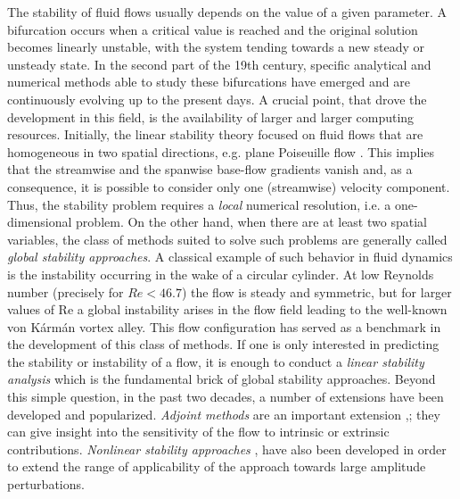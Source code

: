 \documentclass[twocolumn,10pt]{asme2ej}
\begin{document}
The stability of fluid flows usually depends on the value of a given parameter. A bifurcation occurs when a critical value is reached and the original solution becomes linearly unstable, with the system tending towards a new steady or unsteady state. 
In the second part of the 19th century, specific analytical and numerical methods able to study these bifurcations have emerged and are continuously evolving up to the present days. 
A crucial point, that drove the development in this field, is the availability of larger and larger computing resources. 
Initially, the linear stability theory focused on fluid flows that are homogeneous in two spatial directions, e.g. plane Poiseuille flow \cite{Dreid2004}. This implies that the streamwise and the spanwise base-flow gradients vanish and, as a consequence, it is possible to consider only one (streamwise) velocity component. Thus, the stability problem requires a \textit{local} numerical resolution, i.e. a one-dimensional problem.
On the other hand,  when there are at least two spatial variables, the class of methods suited to solve such problems are generally called {\em global stability approaches}.
A classical example of such behavior in fluid dynamics is the instability occurring in the wake of a circular cylinder. At low Reynolds number (precisely for $Re < 46.7$) the flow is steady and symmetric, but for larger values of Re a global instability arises in the flow field leading to the well-known von K\'arm\'an vortex alley. 
This flow configuration has served as a benchmark in the development of this class of methods.  
If one is only interested in predicting the stability or instability of a flow, it is enough to conduct a {\em linear stability analysis} which is the fundamental brick of global stability approaches. 
Beyond this simple question, in the past two decades, a number of extensions have been developed and popularized.  {\em Adjoint methods} are an important extension \cite{GiannettiLuchini},\cite{Marquet}; they can give insight into the sensitivity of the flow to intrinsic or extrinsic contributions. 
{\em Nonlinear stability approaches} \cite{MLugo2014}, \cite{SippLebedev} have also been developed in order to extend the range of applicability of the approach towards large amplitude perturbations.
\end{document}
